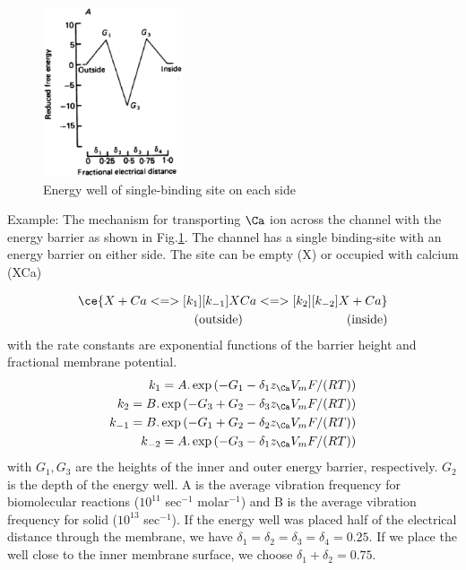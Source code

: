 \begin{figure}[hbt]
  \centerline{\includegraphics[height=5cm,
    angle=0]{./images/energy_well.eps}}
\caption{Energy well of single-binding site on each side}
\label{fig:energy_well}
\end{figure}

Example: The mechanism for transporting $\Ca$ ion across the channel with the
energy barrier as shown in Fig.\ref{fig:energy_well}. The channel has a single
binding-site with an energy barrier on either side.
The site can be empty (X) or occupied with calcium (XCa)

\begin{equation*}
  \begin{split}
    \ce{X + Ca <=>[k_1][k_{-1}] XCa <=>[k_2][k_{-2}] X + Ca} \\
    \text{(outside)} \;\;\;\;\;\; \;\;\;\;\;\; \;\;\;\;\;\; \;\;\;\;\;\; \;\;\;\;\;\;\text{(inside)}
  \end{split}
\end{equation*}
with the rate constants are exponential functions of the barrier
height and fractional membrane potential.
\begin{eqnarray}
  \label{eq:1041}
  k_1 = A.\exp\left(-G_1 -\delta_1z_\Ca V_mF/(RT) \right) \\
  k_2 = B.\exp\left(-G_3 + G_2-\delta_3z_\Ca V_mF/(RT) \right) \\
  k_{-1} = B.\exp\left(-G_1 + G_2-\delta_2z_\Ca V_mF/(RT) \right) \\
  k_{-2} = A.\exp\left(-G_3 -\delta_1 z_\Ca V_mF/(RT) \right)
\end{eqnarray}
with $G_1,G_3$ are the heights of the inner and outer energy barrier,
respectively. $G_2$ is the depth of the energy well. A is the average
vibration frequency for biomolecular reactions ($10^{11}$ sec$^{-1}$
molar$^{-1}$) and B is the average vibration frequency for solid
($10^{13}$ sec$^{-1}$). If the energy well was placed half of the
electrical distance through the membrane, we have
$\delta_1=\delta_2=\delta_3=\delta_4=0.25$. If we place the well close
to the inner membrane surface, we choose $\delta_1+\delta_2=0.75$.

